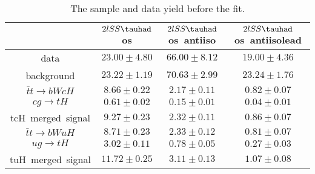 \begin{table}
\caption{The sample and data yield before the fit.}
\centering
\begin{tabular}{|c|c|c|c|} \hline
 & $2lSS\tauhad$ os & $2lSS\tauhad$ os~antiiso & $2lSS\tauhad$ os~antiisolead\\\hline
data & $23.00\pm4.80$ & $66.00\pm8.12$ & $19.00\pm4.36$\\\hline
background & $23.22\pm1.19$ & $70.63\pm2.99$ & $23.24\pm1.76$\\\hline
$\bar{t}t\to bWcH$ & $8.66\pm0.22$ & $2.17\pm0.11$ & $0.82\pm0.07$\\\hline
$cg\to tH$ & $0.61\pm0.02$ & $0.15\pm0.01$ & $0.04\pm0.01$\\\hline
tcH~merged~signal & $9.27\pm0.23$ & $2.32\pm0.11$ & $0.86\pm0.07$\\\hline
$\bar{t}t\to bWuH$ & $8.71\pm0.23$ & $2.33\pm0.12$ & $0.81\pm0.07$\\\hline
$ug\to tH$ & $3.02\pm0.11$ & $0.78\pm0.05$ & $0.27\pm0.03$\\\hline
tuH~merged~signal & $11.72\pm0.25$ & $3.11\pm0.13$ & $1.07\pm0.08$\\\hline
\end{tabular}
\label{tab:yield}
\end{table}
